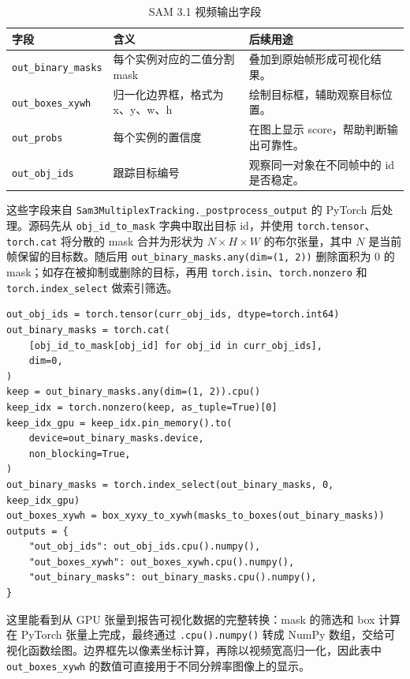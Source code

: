 \documentclass[UTF8,a4paper,zihao=-4,fontset=none]{ctexart}
\begin{document}
\begin{table}[H]
  \centering
  \small
  \caption{SAM 3.1 视频输出字段}
  \label{tab:output-fields}
  \begin{tabular}{L{4.1cm}L{4.0cm}L{5.0cm}}
    \toprule
    字段 & 含义 & 后续用途 \\
    \midrule
    \texttt{out\_binary\_masks} & 每个实例对应的二值分割 mask & 叠加到原始帧形成可视化结果。 \\
    \texttt{out\_boxes\_xywh} & 归一化边界框，格式为 x、y、w、h & 绘制目标框，辅助观察目标位置。 \\
    \texttt{out\_probs} & 每个实例的置信度 & 在图上显示 score，帮助判断输出可靠性。 \\
    \texttt{out\_obj\_ids} & 跟踪目标编号 & 观察同一对象在不同帧中的 id 是否稳定。 \\
    \bottomrule
  \end{tabular}
\end{table}

这些字段来自 \texttt{Sam3MultiplexTracking.\_postprocess\_output} 的 PyTorch 后处理。源码先从 \texttt{obj\_id\_to\_mask} 字典中取出目标 id，并使用 \texttt{torch.tensor}、\texttt{torch.cat} 将分散的 mask 合并为形状为 $N \times H \times W$ 的布尔张量，其中 $N$ 是当前帧保留的目标数。随后用 \texttt{out\_binary\_masks.any(dim=(1, 2))} 删除面积为 0 的 mask；如存在被抑制或删除的目标，再用 \texttt{torch.isin}、\texttt{torch.nonzero} 和 \texttt{torch.index\_select} 做索引筛选。

\begin{lstlisting}[style=pythoncode,caption={输出后处理中的 PyTorch 张量操作摘录}]
out_obj_ids = torch.tensor(curr_obj_ids, dtype=torch.int64)
out_binary_masks = torch.cat(
    [obj_id_to_mask[obj_id] for obj_id in curr_obj_ids],
    dim=0,
)
keep = out_binary_masks.any(dim=(1, 2)).cpu()
keep_idx = torch.nonzero(keep, as_tuple=True)[0]
keep_idx_gpu = keep_idx.pin_memory().to(
    device=out_binary_masks.device,
    non_blocking=True,
)
out_binary_masks = torch.index_select(out_binary_masks, 0, keep_idx_gpu)
out_boxes_xywh = box_xyxy_to_xywh(masks_to_boxes(out_binary_masks))
outputs = {
    "out_obj_ids": out_obj_ids.cpu().numpy(),
    "out_boxes_xywh": out_boxes_xywh.cpu().numpy(),
    "out_binary_masks": out_binary_masks.cpu().numpy(),
}
\end{lstlisting}

这里能看到从 GPU 张量到报告可视化数据的完整转换：mask 的筛选和 box 计算在 PyTorch 张量上完成，最终通过 \texttt{.cpu().numpy()} 转成 NumPy 数组，交给可视化函数绘图。边界框先以像素坐标计算，再除以视频宽高归一化，因此表中 \texttt{out\_boxes\_xywh} 的数值可直接用于不同分辨率图像上的显示。
\end{document}
